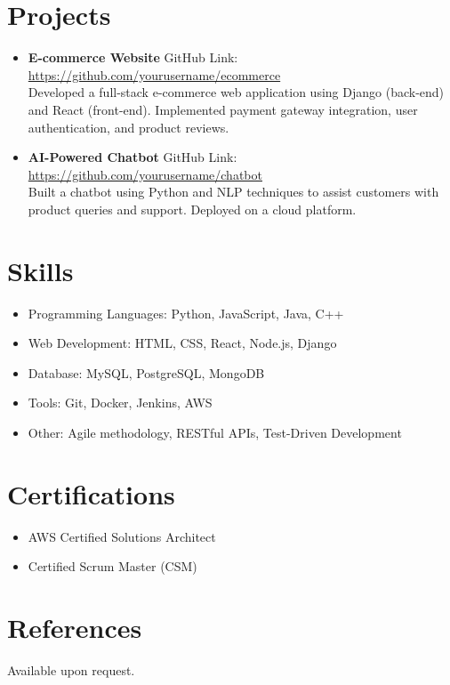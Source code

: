 \documentclass[a4paper,10pt]{article}  %
\newcommand{\ressection}[1]{\section*{\large \textbf{#1}}}
\newcommand{\resitem}[1]{\item \textbf{#1}}
\begin{document}
	\ressection{Projects}
	\begin{itemize}[left=0pt]
		\resitem{E-commerce Website} \hfill GitHub Link: \href{https://github.com/yourusername/ecommerce}{https://github.com/yourusername/ecommerce} \\
		Developed a full-stack e-commerce web application using Django (back-end) and React (front-end). Implemented payment gateway integration, user authentication, and product reviews.
		
		\resitem{AI-Powered Chatbot} \hfill GitHub Link: \href{https://github.com/yourusername/chatbot}{https://github.com/yourusername/chatbot} \\
		Built a chatbot using Python and NLP techniques to assist customers with product queries and support. Deployed on a cloud platform.
	\end{itemize}
	
	\ressection{Skills}
	\begin{itemize}[left=0pt]
		\item Programming Languages: Python, JavaScript, Java, C++
		\item Web Development: HTML, CSS, React, Node.js, Django
		\item Database: MySQL, PostgreSQL, MongoDB
		\item Tools: Git, Docker, Jenkins, AWS
		\item Other: Agile methodology, RESTful APIs, Test-Driven Development
	\end{itemize}
	
	\ressection{Certifications}
	\begin{itemize}[left=0pt]
		\item AWS Certified Solutions Architect
		\item Certified Scrum Master (CSM)
	\end{itemize}
	
	\ressection{References}
	Available upon request.
	
\end{document}
